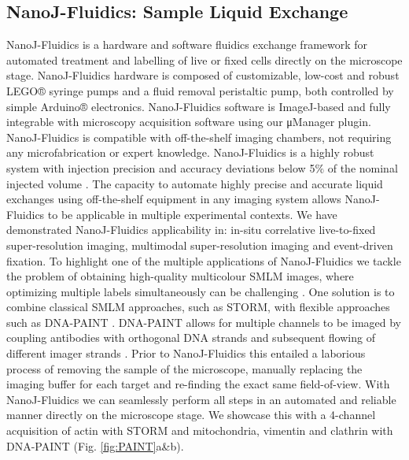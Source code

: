 \subsection*{NanoJ-Fluidics: Sample Liquid Exchange}
NanoJ-Fluidics is a hardware and software fluidics exchange framework for automated treatment and labelling of live or fixed cells directly on the microscope stage. NanoJ-Fluidics hardware is composed of customizable, low-cost and robust LEGO® syringe pumps and a fluid removal peristaltic pump, both controlled by simple Arduino® electronics. NanoJ-Fluidics software is ImageJ-based and fully integrable with microscopy acquisition software using our μManager plugin. NanoJ-Fluidics is compatible with off-the-shelf imaging chambers, not requiring any microfabrication or expert knowledge. NanoJ-Fluidics is a highly robust system with injection precision and accuracy deviations below 5$\%$ of the nominal injected volume \cite{almada2018automating}. 
The capacity to automate highly precise and accurate liquid exchanges using off-the-shelf equipment in any imaging system allows NanoJ-Fluidics to be applicable in multiple experimental contexts. We have demonstrated NanoJ-Fluidics applicability in: in-situ correlative live-to-fixed super-resolution imaging, multimodal super-resolution imaging and event-driven fixation. To highlight one of the multiple applications of NanoJ-Fluidics we tackle the problem of obtaining high-quality multicolour SMLM images, where optimizing multiple labels simultaneously can be challenging \cite{dempsey2011evaluation}. One solution is to combine classical SMLM approaches, such as STORM, with flexible approaches such as DNA-PAINT \cite{jungmann2014multiplexed}. DNA-PAINT allows for multiple channels to be imaged by coupling antibodies with orthogonal DNA strands and subsequent flowing of different imager strands \cite{jungmann2014multiplexed}. Prior to NanoJ-Fluidics this entailed a laborious process of removing the sample of the microscope, manually replacing the imaging buffer for each target and re-finding the exact same field-of-view. With NanoJ-Fluidics we can seamlessly perform all steps in an automated and reliable manner directly on the microscope stage. We showcase this with a 4-channel acquisition of actin with STORM and mitochondria, vimentin and clathrin with DNA-PAINT (Fig. \ref{fig:PAINT}a&b). 
